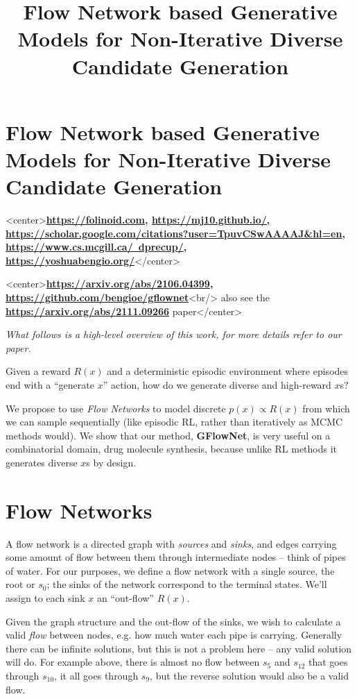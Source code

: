 
\title{Flow Network based Generative Models for Non-Iterative Diverse Candidate Generation}
\section{Flow Network based Generative Models for Non-Iterative Diverse Candidate Generation}
<center>\textbf{\href{Emmanuel Bengio}{https://folinoid.com}, \href{Moksh Jain}{https://mj10.github.io/}, \href{Maksym Korablyov}{https://scholar.google.com/citations?user=TpuvCSwAAAAJ&hl=en}, \href{Doina Precup}{https://www.cs.mcgill.ca/~dprecup/}, \href{Yoshua Bengio}{https://yoshuabengio.org/}}</center>


<center>\textbf{\href{arXiv preprint}{https://arxiv.org/abs/2106.04399}, \href{code}{https://github.com/bengioe/gflownet}}<br/> also see the \textbf{\href{GFlowNet Foundations}{https://arxiv.org/abs/2111.09266}} paper</center>

\emph{What follows is a high-level overview of this work, for more details refer to our paper.}

Given a reward $R(x)$ and a deterministic episodic environment where episodes end with a ``generate $x$'' action, how do we generate diverse and high-reward $x$s?

We propose to use \emph{Flow Networks} to model discrete $p(x) \propto R(x)$ from which we can sample sequentially (like episodic RL, rather than iteratively as MCMC methods would). We show that our method, \textbf{GFlowNet}, is very useful on a combinatorial domain, drug molecule synthesis, because unlike RL methods it generates diverse $x$s by design.

\section{Flow Networks}

A flow network is a directed graph with \emph{sources} and \emph{sinks}, and edges carrying some amount of flow between them through intermediate nodes -- think of pipes of water. For our purposes, we define a flow network with a single source, the root or $s_0$; the sinks of the network correspond to the terminal states. We'll assign to each sink $x$ an ``out-flow'' $R(x)$. 


Given the graph structure and the out-flow of the sinks, we wish to calculate a valid \emph{flow} between nodes, e.g. how much water each pipe is carrying. Generally there can be infinite solutions, but this is not a problem here -- any valid solution will do. For example above, there is almost no flow between $s_5$ and $s_{12}$ that goes through $s_{10}$, it all goes through $s_9$, but the reverse solution would also be a valid flow.

